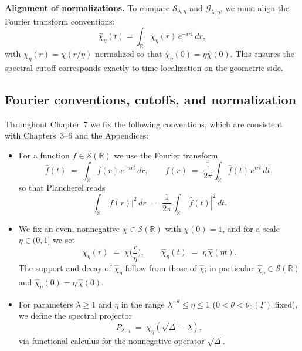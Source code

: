 \medskip

\noindent\textbf{Alignment of normalizations.}
To compare $\mathcal{S}_{\lambda,\eta}$ and $\mathcal{G}_{\lambda,\eta}$,
we must align the Fourier transform conventions:
\[
  \widehat{\chi}_\eta(t) = \int_{\mathbb{R}} \chi_\eta(r)\, e^{-irt}\, dr,
\]
with $\chi_\eta(r) = \chi(r/\eta)$ normalized so that
$\widehat{\chi}_\eta(0) = \eta \widehat{\chi}(0)$.
This ensures the spectral cutoff corresponds exactly to time-localization
on the geometric side.



\subsection{Fourier conventions, cutoffs, and normalization} \label{subsec:7.1-Fourier}

Throughout Chapter~7 we fix the following conventions, which are consistent with Chapters~3--6 and the Appendices:

\begin{itemize}
  \item For a function $f\in \mathcal{S}(\mathbb{R})$ we use the Fourier transform
  \[
    \widehat{f}(t) \;=\; \int_{\mathbb{R}} f(r)\, e^{-i r t}\, dr,
    \qquad
    f(r) \;=\; \frac{1}{2\pi}\int_{\mathbb{R}} \widehat{f}(t)\, e^{i r t}\, dt,
  \]
  so that Plancherel reads
  \[
    \int_{\mathbb{R}} |f(r)|^2\, dr \;=\; \frac{1}{2\pi}\int_{\mathbb{R}} |\widehat{f}(t)|^2\, dt.
  \]
  \item We fix an even, nonnegative $\chi\in \mathcal{S}(\mathbb{R})$ with $\chi(0)=1$, and for a scale $\eta\in(0,1]$ we set
  \[
    \chi_\eta(r)\;=\;\chi\Big(\frac{r}{\eta}\Big), \qquad
    \widehat{\chi}_\eta(t) \;=\; \eta\, \widehat{\chi}(\eta t).
  \]
  The support and decay of $\widehat{\chi}_\eta$ follow from those of $\widehat{\chi}$; in particular $\widehat{\chi}_\eta\in\mathcal{S}(\mathbb{R})$ and $\widehat{\chi}_\eta(0)=\eta\,\widehat{\chi}(0)$.
  \item For parameters $\lambda\ge 1$ and $\eta$ in the range $\lambda^{-\theta}\le \eta\le 1$ ($0<\theta<\theta_0(\Gamma)$ fixed), we define the spectral projector
  \[
    P_{\lambda,\eta} \;=\; \chi_\eta(\sqrt{\Delta}-\lambda),
  \]
  via functional calculus for the nonnegative operator $\sqrt{\Delta}$.
\end{itemize}

